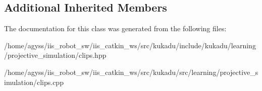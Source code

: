 \subsection*{Additional Inherited Members}


The documentation for this class was generated from the following files\+:\begin{DoxyCompactItemize}
\item 
/home/agyss/iis\+\_\+robot\+\_\+sw/iis\+\_\+catkin\+\_\+ws/src/kukadu/include/kukadu/learning/projective\+\_\+simulation/clips.\+hpp\item 
/home/agyss/iis\+\_\+robot\+\_\+sw/iis\+\_\+catkin\+\_\+ws/src/kukadu/src/learning/projective\+\_\+simulation/clips.\+cpp\end{DoxyCompactItemize}
